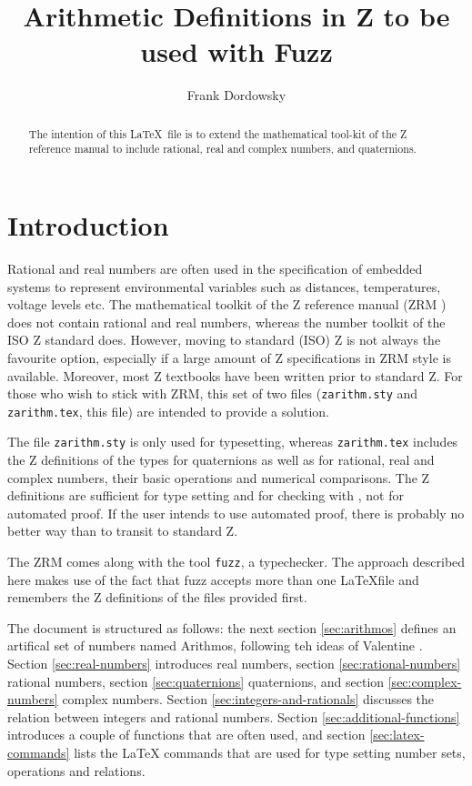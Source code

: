\documentclass[12pt]{article}
\begin{document}
\title{Arithmetic Definitions in  Z to be used with Fuzz}

\author{Frank Dordowsky}

\maketitle

\begin{abstract}
  The intention of this \LaTeX\ file is to extend the mathematical
  tool-kit of the Z reference manual to include rational, real and
  complex numbers, and quaternions.
\end{abstract}


\section{Introduction}
\label{sec:intro}
Rational and real numbers are often used in the specification of
embedded systems to represent environmental variables such as
distances, temperatures, voltage levels etc. The mathematical toolkit
of the Z reference manual (ZRM \cite{Spivey1998}) does not contain
rational and real numbers, whereas the number toolkit of the ISO Z
standard does. However, moving to standard (ISO) Z \cite{ISO13568} is
not always the favourite option, especially if a large amount of Z
specifications in ZRM style is available. Moreover, most Z textbooks
have been written prior to standard Z. For those who wish to stick
with ZRM, this set of two files (\texttt{zarithm.sty} and
\texttt{zarithm.tex}, this file) are intended to provide a solution.

The file \texttt{zarithm.sty} is only used for typesetting, whereas
\texttt{zarithm.tex} includes the Z definitions of the types for
quaternions as well as for rational, real and complex numbers, their
basic operations and numerical comparisons. The Z definitions are
sufficient for type setting and for checking with , not for automated
proof. If the user intends to use automated proof, there is probably
no better way than to transit to standard Z.

The ZRM comes along with the tool \texttt{fuzz}, a typechecker. The
approach described here makes use of the fact that fuzz accepts more
than one \LaTeX file and remembers the Z definitions of the files
provided first.

The document is structured as follows: the next section
\ref{sec:arithmos} defines an artifical set of numbers named Arithmos,
following teh ideas of Valentine \cite{Valentine2012}. Section
\ref{sec:real-numbers} introduces real numbers, section
\ref{sec:rational-numbers} rational numbers, section
\ref{sec:quaternions} quaternions, and section
\ref{sec:complex-numbers} complex numbers. Section
\ref{sec:integers-and-rationals} discusses the relation between
integers and rational numbers. Section \ref{sec:additional-functions}
introduces a couple of functions that are often used, and section
\ref{sec:latex-commands} lists the \LaTeX{} commands that are used for
type setting number sets, operations and relations.
%
\end{document}
